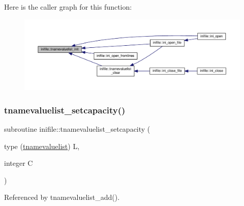 Here is the caller graph for this function\+:
\nopagebreak
\begin{figure}[H]
\begin{center}
\leavevmode
\includegraphics[width=350pt]{namespaceinifile_a1b5283277321bb0c12d8495bd16c23be_icgraph}
\end{center}
\end{figure}
\mbox{\label{namespaceinifile_a761b93f34948645a73d7311a0dd5f833}} 
\subsubsection{\texorpdfstring{tnamevaluelist\+\_\+setcapacity()}{tnamevaluelist\_setcapacity()}}
{\footnotesize\ttfamily subroutine inifile\+::tnamevaluelist\+\_\+setcapacity (\begin{DoxyParamCaption}\item[{type (\mbox{\hyperlink{structinifile_1_1tnamevaluelist}{tnamevaluelist}})}]{L,  }\item[{integer}]{C }\end{DoxyParamCaption})}



Referenced by tnamevaluelist\+\_\+add().

